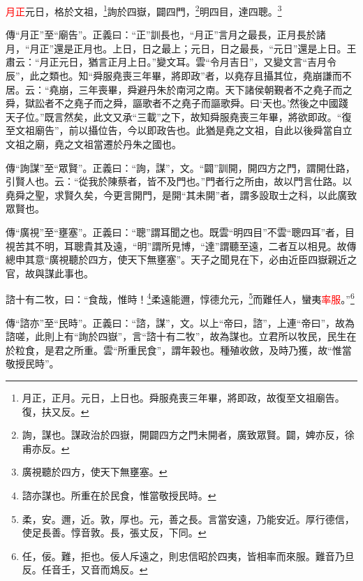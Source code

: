 \textcolor{red}{月正}元日，格於文祖，\footnote{月正，正月。元日，上日也。舜服堯喪三年畢，將即政，故復至文祖廟告。復，扶又反。}詢於四嶽，闢四門，\footnote{詢，謀也。謀政治於四嶽，開闢四方之門未開者，廣致眾賢。闢，婢亦反，徐甫亦反。}明四目，達四聰。\footnote{廣視聽於四方，使天下無壅塞。}

{\noindent\zhuan{}\fzbyks 傳“月正”至“廟告”。正義曰：“正”訓長也，“月正”言月之最長，正月長於諸月，“月正”還是正月也。上日，日之最上；元日，日之最長，“元日”還是上日。王肅云：“月正元日，猶言正月上日。”變文耳。雲“令月吉日”，又變文言“吉月令辰”，此之類也。知“舜服堯喪三年畢，將即政”者，以堯存且攝其位，堯崩謙而不居。云：“堯崩，三年喪畢，舜避丹朱於南河之南。天下諸侯朝覲者不之堯子而之舜，獄訟者不之堯子而之舜，謳歌者不之堯子而謳歌舜。曰‘天也。’然後之中國踐天子位。”既言然矣，此文又承“三載”之下，故知舜服堯喪三年畢，將欲即政。“復至文祖廟告”，前以攝位告，今以即政告也。此猶是堯之文祖，自此以後舜當自立文祖之廟，堯之文祖當遷於丹朱之國也。 \par}

{\noindent\zhuan{}\fzbyks 傳“詢謀”至“眾賢”。正義曰：“詢，謀”，文。“闢”訓開，開四方之門，謂開仕路，引賢人也。云：“從我於陳蔡者，皆不及門也。”門者行之所由，故以門言仕路。以堯舜之聖，求賢久矣，今更言開門，是開“其未開”者，謂多設取士之科，以此廣致眾賢也。 \par}

{\noindent\zhuan{}\fzbyks 傳“廣視”至“壅塞”。正義曰：“聰”謂耳聞之也。既雲“明四目”不雲“聰四耳”者，目視苦其不明，耳聰貴其及遠，“明”謂所見博，“達”謂聽至遠，二者互以相見。故傳總申其意“廣視聽於四方，使天下無壅塞”。天子之聞見在下，必由近臣四嶽親近之官，故與謀此事也。 \par}

諮十有二牧，曰：“食哉，惟時！\footnote{諮亦謀也。所重在於民食，惟當敬授民時。}柔遠能邇，惇德允元，\footnote{柔，安。邇，近。敦，厚也。元，善之長。言當安遠，乃能安近。厚行德信，使足長善。惇音敦。長，張丈反，下同。}而難任人，蠻夷\textcolor{red}{率服}。”\footnote{任，佞。難，拒也。佞人斥遠之，則忠信昭於四夷，皆相率而來服。難音乃旦反。任音壬，又音而鴆反。}

{\noindent\zhuan{}\fzbyks 傳“諮亦”至“民時”。正義曰：“諮，謀”，文。以上“帝曰，諮”，上連“帝曰”，故為諮嗟，此則上有“詢於四嶽”，言“諮十有二牧”，故為謀也。立君所以牧民，民生在於粒食，是君之所重。雲“所重民食”，謂年穀也。種殖收斂，及時乃獲，故“惟當敬授民時”。 \par}

